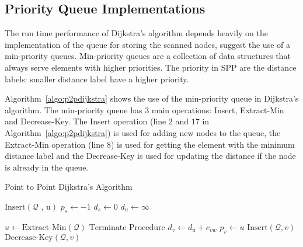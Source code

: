 \subsection{Priority Queue Implementations}
The run time performance of Dijkstra's algorithm depends heavily on the implementation of the queue for storing the scanned nodes,
\citet{Cormen} suggest the use of a min-priority queues.
Min-priority queues are a collection of data structures that always serve elements with higher priorities. The priority in SPP are the distance labels:
smaller distance label have a higher priority.

Algorithm~\ref{algo:p2pdijkstra} shows the use of the min-priority queue in Dijkstra's algorithm.
The min-priority queue has 3 main operations: Insert, Extract-Min and Decrease-Key.
The Insert operation (line $2$ and $17$ in Algorithm~\ref{algo:p2pdijkstra}) is used for adding new nodes to the queue, the Extract-Min operation (line 8) is used for getting the element with the minimum distance label and the Decrease-Key is used for updating the distance if the node is already in the queue.

\begin{algorithm}[H]
    \caption{Point to Point Dijkstra's Algorithm}
    \label{algo:p2pdijkstra}
    \begin{algorithmic}[1]
        \State $\text{Insert}(\mathcal{Q}\text{ , u})$ 
        \State $p_s \gets -1$ 
        \State $d_s \gets 0$
         
        \State $d_u \gets \infty$
    \EndFor

    \State $ u \gets \text{Extract-Min}(\mathcal{Q}) $ 
    \State $\text{Terminate Procedure}$ 
\EndIf
{}
 
\State $d_v \gets d_u + c_{vw}$
\State $p_v \gets u$
\State $\text{Insert}(\mathcal{Q}, v)$ 
\Else
\State $\text{Decrease-Key}(\mathcal{Q}, v)$ 
    \EndIf
\EndIf
                \EndFor
            \EndIf
        \EndWhile
    \EndProcedure
\end{algorithmic}
\end{algorithm}

